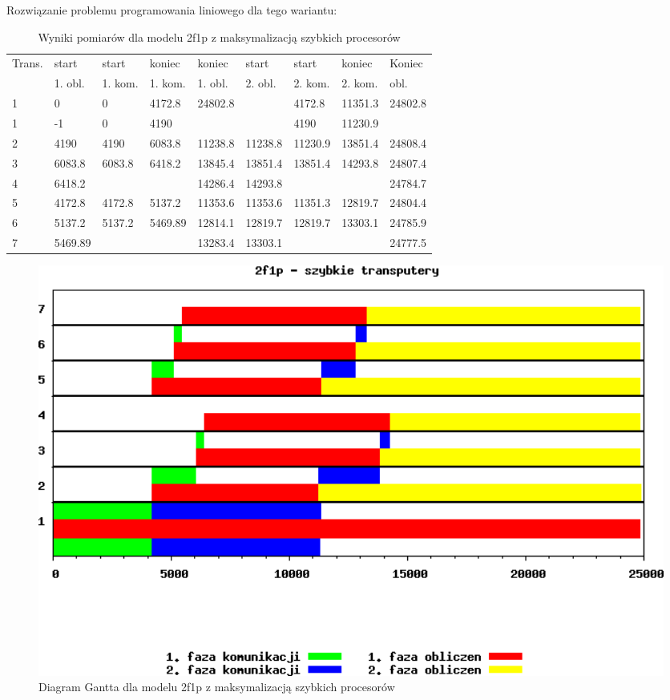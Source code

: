 \documentclass[a4paper,11pt, titlepage]{article}
\begin{document}
Rozwiązanie problemu programowania liniowego dla tego wariantu:
\begin{table}[hp!]
\begin{tabular}{|l|l|l|l|l|l|l|l|l|}\hline
Trans.	&start &start &koniec &koniec &start &start	&koniec	&Koniec\\
&1. obl. &1. kom. &1. kom. &1. obl. &2. obl. &2. kom.	&2.	kom. &obl.\\ \hline
1	&0			&0		&4172.8		&24802.8	&			&4172.8		&11351.3	&24802.8\\ \hline
1	&-1			&0		&4190		&			&			&4190		&11230.9	&\\ \hline
2	&4190		&4190	&6083.8		&11238.8	&11238.8	&11230.9	&13851.4	&24808.4\\ \hline
3	&6083.8		&6083.8	&6418.2		&13845.4	&13851.4	&13851.4	&14293.8	&24807.4\\ \hline
4	&6418.2		&		&			&14286.4	&14293.8	&			&			&24784.7\\ \hline
5	&4172.8		&4172.8	&5137.2		&11353.6	&11353.6	&11351.3	&12819.7	&24804.4\\ \hline
6	&5137.2		&5137.2	&5469.89	&12814.1	&12819.7	&12819.7	&13303.1	&24785.9\\ \hline
7	&5469.89	&		&			&13283.4	&13303.1	&			&			&24777.5\\ \hline
\end{tabular}
\caption{Wyniki pomiarów dla modelu 2f1p z maksymalizacją szybkich procesorów \label{2f1p_pt}}
\end{table}

\begin{figure}[htp!]
\includegraphics[width=1.0\textwidth]{wykresy/1p2f_proc}
\caption{Diagram Gantta dla modelu 2f1p z maksymalizacją szybkich procesorów \label{1p2f_p}}
\end{figure}
\end{document}
